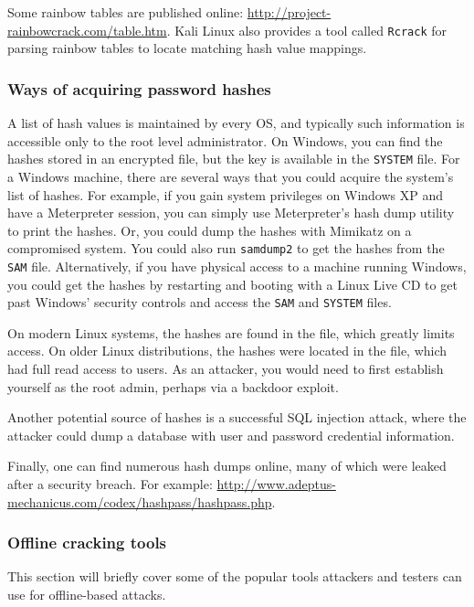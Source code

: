 Some rainbow tables are published online: \url{http://project-rainbowcrack.com/table.htm}. Kali Linux also provides a tool called \verb|Rcrack| for parsing rainbow tables to locate matching hash value mappings.

\subsubsection{Ways of acquiring password hashes}
  A list of hash values is maintained by every OS, and typically such information is accessible only to the root level administrator. On Windows, you can find the hashes stored in an encrypted  file, but the key is available in the \verb|SYSTEM| file. For a Windows machine, there are several ways that you could acquire the system’s list of hashes. For example, if you gain system privileges on Windows XP and have a Meterpreter session, you can simply use Meterpreter’s hash dump utility to print the hashes. Or, you could dump the hashes with Mimikatz on a compromised system. You could also run \verb|samdump2| to get the hashes from the \verb|SAM| file. Alternatively, if you have physical access to a machine running Windows, you could get the hashes by restarting and booting with a Linux Live CD to get past Windows' security controls and access the \verb|SAM| and \verb|SYSTEM| files.

  On modern Linux systems, the hashes are found in the  file, which greatly limits access. On older Linux distributions, the hashes were located in the  file, which had full read access to users. As an attacker, you would need to first establish yourself as the root admin, perhaps via a backdoor exploit.

  Another potential source of hashes is a successful SQL injection attack, where the attacker could dump a database with user and password credential information.

  Finally, one can find numerous hash dumps online, many of which were leaked after a security breach. For example: \url{http://www.adeptus-mechanicus.com/codex/hashpass/hashpass.php}.

\subsubsection{Offline cracking tools}

This section will briefly cover some of the popular tools attackers and testers can use for offline-based attacks.

